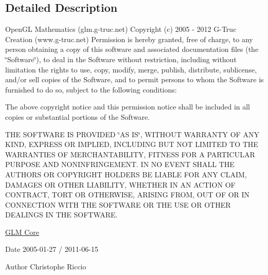 \subsection{Detailed Description}
Open\-G\-L Mathematics (glm.\-g-\/truc.\-net) Copyright (c) 2005 -\/ 2012 G-\/\-Truc Creation (www.\-g-\/truc.\-net) Permission is hereby granted, free of charge, to any person obtaining a copy of this software and associated documentation files (the \char`\"{}\-Software\char`\"{}), to deal in the Software without restriction, including without limitation the rights to use, copy, modify, merge, publish, distribute, sublicense, and/or sell copies of the Software, and to permit persons to whom the Software is furnished to do so, subject to the following conditions\-:

The above copyright notice and this permission notice shall be included in all copies or substantial portions of the Software.

T\-H\-E S\-O\-F\-T\-W\-A\-R\-E I\-S P\-R\-O\-V\-I\-D\-E\-D \char`\"{}\-A\-S I\-S\char`\"{}, W\-I\-T\-H\-O\-U\-T W\-A\-R\-R\-A\-N\-T\-Y O\-F A\-N\-Y K\-I\-N\-D, E\-X\-P\-R\-E\-S\-S O\-R I\-M\-P\-L\-I\-E\-D, I\-N\-C\-L\-U\-D\-I\-N\-G B\-U\-T N\-O\-T L\-I\-M\-I\-T\-E\-D T\-O T\-H\-E W\-A\-R\-R\-A\-N\-T\-I\-E\-S O\-F M\-E\-R\-C\-H\-A\-N\-T\-A\-B\-I\-L\-I\-T\-Y, F\-I\-T\-N\-E\-S\-S F\-O\-R A P\-A\-R\-T\-I\-C\-U\-L\-A\-R P\-U\-R\-P\-O\-S\-E A\-N\-D N\-O\-N\-I\-N\-F\-R\-I\-N\-G\-E\-M\-E\-N\-T. I\-N N\-O E\-V\-E\-N\-T S\-H\-A\-L\-L T\-H\-E A\-U\-T\-H\-O\-R\-S O\-R C\-O\-P\-Y\-R\-I\-G\-H\-T H\-O\-L\-D\-E\-R\-S B\-E L\-I\-A\-B\-L\-E F\-O\-R A\-N\-Y C\-L\-A\-I\-M, D\-A\-M\-A\-G\-E\-S O\-R O\-T\-H\-E\-R L\-I\-A\-B\-I\-L\-I\-T\-Y, W\-H\-E\-T\-H\-E\-R I\-N A\-N A\-C\-T\-I\-O\-N O\-F C\-O\-N\-T\-R\-A\-C\-T, T\-O\-R\-T O\-R O\-T\-H\-E\-R\-W\-I\-S\-E, A\-R\-I\-S\-I\-N\-G F\-R\-O\-M, O\-U\-T O\-F O\-R I\-N C\-O\-N\-N\-E\-C\-T\-I\-O\-N W\-I\-T\-H T\-H\-E S\-O\-F\-T\-W\-A\-R\-E O\-R T\-H\-E U\-S\-E O\-R O\-T\-H\-E\-R D\-E\-A\-L\-I\-N\-G\-S I\-N T\-H\-E S\-O\-F\-T\-W\-A\-R\-E.

\hyperlink{group__core}{G\-L\-M Core}

\begin{DoxyDate}{Date}
2005-\/01-\/27 / 2011-\/06-\/15 
\end{DoxyDate}
\begin{DoxyAuthor}{Author}
Christophe Riccio 
\end{DoxyAuthor}
